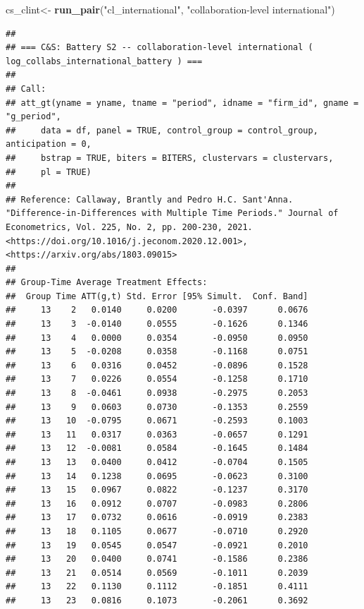 \documentclass[
]{article}
\newenvironment{Shaded}{\begin{snugshade}}{\end{snugshade}}
\newcommand{\FunctionTok}[1]{\textcolor[rgb]{0.13,0.29,0.53}{\textbf{#1}}}
\newcommand{\NormalTok}[1]{#1}
\newcommand{\OtherTok}[1]{\textcolor[rgb]{0.56,0.35,0.01}{#1}}
\newcommand{\StringTok}[1]{\textcolor[rgb]{0.31,0.60,0.02}{#1}}
\begin{document}
\begin{Shaded}
\begin{Highlighting}[]
\NormalTok{cs\_clint}\OtherTok{\textless{}{-}} \FunctionTok{run\_pair}\NormalTok{(}\StringTok{"cl\_international"}\NormalTok{, }\StringTok{"collaboration{-}level international"}\NormalTok{)}
\end{Highlighting}
\end{Shaded}

\begin{verbatim}
## 
## === C&S: Battery S2 -- collaboration-level international ( log_collabs_international_battery ) ===
## 
## Call:
## att_gt(yname = yname, tname = "period", idname = "firm_id", gname = "g_period", 
##     data = df, panel = TRUE, control_group = control_group, anticipation = 0, 
##     bstrap = TRUE, biters = BITERS, clustervars = clustervars, 
##     pl = TRUE)
## 
## Reference: Callaway, Brantly and Pedro H.C. Sant'Anna.  "Difference-in-Differences with Multiple Time Periods." Journal of Econometrics, Vol. 225, No. 2, pp. 200-230, 2021. <https://doi.org/10.1016/j.jeconom.2020.12.001>, <https://arxiv.org/abs/1803.09015> 
## 
## Group-Time Average Treatment Effects:
##  Group Time ATT(g,t) Std. Error [95% Simult.  Conf. Band]  
##     13    2   0.0140     0.0200       -0.0397      0.0676  
##     13    3  -0.0140     0.0555       -0.1626      0.1346  
##     13    4   0.0000     0.0354       -0.0950      0.0950  
##     13    5  -0.0208     0.0358       -0.1168      0.0751  
##     13    6   0.0316     0.0452       -0.0896      0.1528  
##     13    7   0.0226     0.0554       -0.1258      0.1710  
##     13    8  -0.0461     0.0938       -0.2975      0.2053  
##     13    9   0.0603     0.0730       -0.1353      0.2559  
##     13   10  -0.0795     0.0671       -0.2593      0.1003  
##     13   11   0.0317     0.0363       -0.0657      0.1291  
##     13   12  -0.0081     0.0584       -0.1645      0.1484  
##     13   13   0.0400     0.0412       -0.0704      0.1505  
##     13   14   0.1238     0.0695       -0.0623      0.3100  
##     13   15   0.0967     0.0822       -0.1237      0.3170  
##     13   16   0.0912     0.0707       -0.0983      0.2806  
##     13   17   0.0732     0.0616       -0.0919      0.2383  
##     13   18   0.1105     0.0677       -0.0710      0.2920  
##     13   19   0.0545     0.0547       -0.0921      0.2010  
##     13   20   0.0400     0.0741       -0.1586      0.2386  
##     13   21   0.0514     0.0569       -0.1011      0.2039  
##     13   22   0.1130     0.1112       -0.1851      0.4111  
##     13   23   0.0816     0.1073       -0.2061      0.3692  

\end{verbatim}
\end{document}
